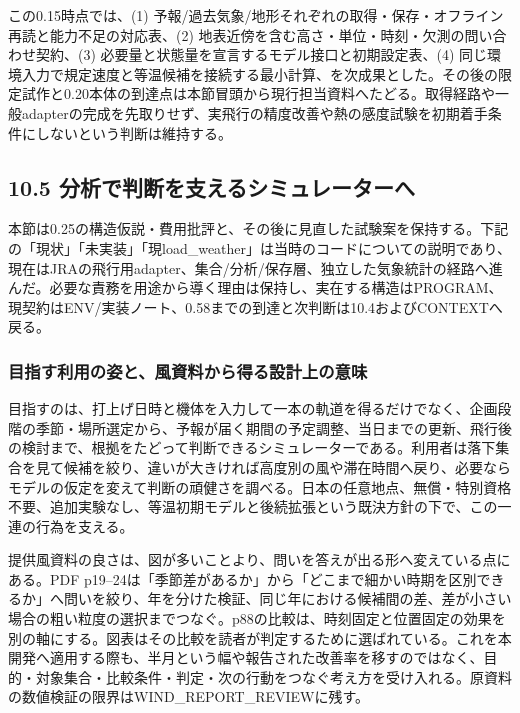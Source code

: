 \documentclass[11pt,a4paper]{article}
\begin{document}
この0.15時点では、(1)
予報/過去気象/地形それぞれの取得・保存・オフライン再読と能力不足の対応表、(2)
地表近傍を含む高さ・単位・時刻・欠測の問い合わせ契約、(3)
必要量と状態量を宣言するモデル接口と初期設定表、(4)
同じ環境入力で規定速度と等温候補を接続する最小計算、を次成果とした。その後の限定試作と0.20本体の到達点は本節冒頭から現行担当資料へたどる。取得経路や一般adapterの完成を先取りせず、実飛行の精度改善や熱の感度試験を初期着手条件にしないという判断は維持する。

\subsection{10.5
分析で判断を支えるシミュレーターへ}\label{ux5206ux6790ux3067ux5224ux65adux3092ux652fux3048ux308bux30b7ux30dfux30e5ux30ecux30fcux30bfux30fcux3078}

本節は0.25の構造仮説・費用批評と、その後に見直した試験案を保持する。下記の「現状」「未実装」「現load\_weather」は当時のコードについての説明であり、現在はJRAの飛行用adapter、集合/分析/保存層、独立した気象統計の経路へ進んだ。必要な責務を用途から導く理由は保持し、実在する構造はPROGRAM、現契約はENV/実装ノート、0.58までの到達と次判断は10.4およびCONTEXTへ戻る。

\subsubsection{目指す利用の姿と、風資料から得る設計上の意味}\label{ux76eeux6307ux3059ux5229ux7528ux306eux59ffux3068ux98a8ux8cc7ux6599ux304bux3089ux5f97ux308bux8a2dux8a08ux4e0aux306eux610fux5473}

目指すのは、打上げ日時と機体を入力して一本の軌道を得るだけでなく、企画段階の季節・場所選定から、予報が届く期間の予定調整、当日までの更新、飛行後の検討まで、根拠をたどって判断できるシミュレーターである。利用者は落下集合を見て候補を絞り、違いが大きければ高度別の風や滞在時間へ戻り、必要ならモデルの仮定を変えて判断の頑健さを調べる。日本の任意地点、無償・特別資格不要、追加実験なし、等温初期モデルと後続拡張という既決方針の下で、この一連の行為を支える。

提供風資料の良さは、図が多いことより、問いを答えが出る形へ変えている点にある。PDF
p19--24は「季節差があるか」から「どこまで細かい時期を区別できるか」へ問いを絞り、年を分けた検証、同じ年における候補間の差、差が小さい場合の粗い粒度の選択までつなぐ。p88の比較は、時刻固定と位置固定の効果を別の軸にする。図表はその比較を読者が判定するために選ばれている。これを本開発へ適用する際も、半月という幅や報告された改善率を移すのではなく、目的・対象集合・比較条件・判定・次の行動をつなぐ考え方を受け入れる。原資料の数値検証の限界はWIND\_REPORT\_REVIEWに残す。
\end{document}
